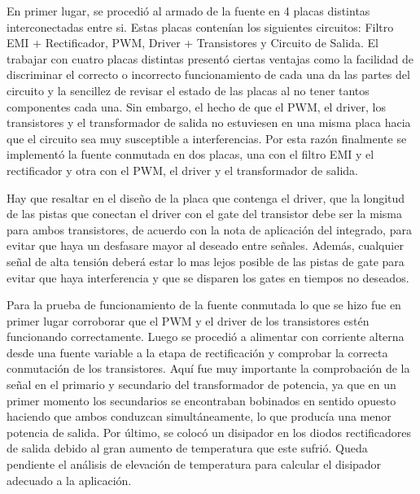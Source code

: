 \documentclass[11pt, a4paper]{article}
\begin{document}
En primer lugar, se procedió al armado de la fuente en 4 placas distintas interconectadas entre si. Estas placas contenían los siguientes circuitos: Filtro EMI + Rectificador, PWM, Driver + Transistores y Circuito de Salida. El trabajar con cuatro placas distintas presentó ciertas ventajas como la facilidad de discriminar el correcto o incorrecto funcionamiento de cada una da las partes del circuito y la sencillez de revisar el estado de las placas al no tener tantos componentes cada una. Sin embargo, el hecho de que el PWM, el driver, los transistores y el transformador de salida no estuviesen en una misma placa hacia que el circuito sea muy susceptible a interferencias. Por esta razón finalmente se implementó la fuente conmutada en dos placas, una con el filtro EMI y el rectificador y otra con el PWM, el driver y el transformador de salida.

Hay que resaltar en el diseño de la placa que contenga el driver, que la longitud de las pistas que conectan el driver con el gate del transistor debe ser la misma para ambos transistores, de acuerdo con la nota de aplicación del integrado, para evitar que haya un desfasare mayor al deseado entre señales. Además, cualquier señal de alta tensión deberá estar lo mas lejos posible de las pistas de gate para evitar que haya interferencia y que se disparen los gates en tiempos no deseados.

Para la prueba de funcionamiento de la fuente conmutada lo que se hizo fue en primer lugar corroborar que el PWM y el driver de los transistores estén funcionando correctamente. Luego se procedió a alimentar con corriente alterna desde una fuente variable a la etapa de rectificación y comprobar la correcta conmutación de los transistores. Aquí fue muy importante la comprobación de la señal en el primario y secundario del transformador de potencia, ya que en un primer momento los secundarios se encontraban bobinados en sentido opuesto haciendo que ambos conduzcan simultáneamente, lo que producía una menor potencia de salida. Por último, se colocó un disipador en los diodos rectificadores de salida debido al gran aumento de temperatura que este sufrió. Queda pendiente el análisis de elevación de temperatura para calcular el disipador adecuado a la aplicación.
\end{document}
